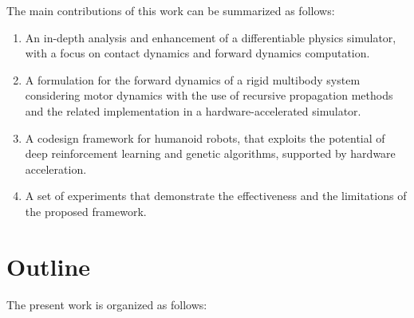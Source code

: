 The main contributions of this work can be summarized as follows:

\begin{enumerate}
    \item An in-depth analysis and enhancement of a differentiable physics simulator, with a focus on contact dynamics and forward dynamics computation.
    \item A formulation for the forward dynamics of a rigid multibody system considering motor dynamics with the use of recursive propagation methods and the related implementation in a hardware-accelerated simulator.
    \item A codesign framework for humanoid robots, that exploits the potential of deep reinforcement learning and genetic algorithms, supported by hardware acceleration.
    \item A set of experiments that demonstrate the effectiveness and the limitations of the proposed framework.
\end{enumerate}


\section*{Outline}

The present work is organized as follows:

